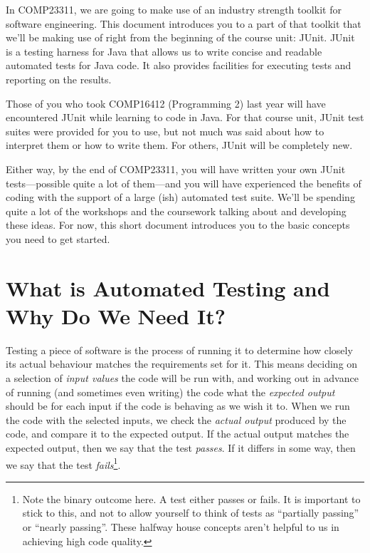 \documentclass[
]{book}
\begin{document}
In COMP23311, we are going to make use of an industry strength toolkit for software engineering. This document introduces you to a part of that toolkit that we'll be making use of right from the beginning of the course unit: JUnit. JUnit is a testing harness for Java that allows us to write concise and readable automated tests for Java code. It also provides facilities for executing tests and reporting on the results.

Those of you who took COMP16412 (Programming 2) last year will have encountered JUnit while learning to code in Java. For that course unit, JUnit test suites were provided for you to use, but not much was said about how to interpret them or how to write them. For others, JUnit will be completely new.

Either way, by the end of COMP23311, you will have written your own JUnit tests---possible quite a lot of them---and you will have experienced the benefits of coding with the support of a large (ish) automated test suite. We'll be spending quite a lot of the workshops and the coursework talking about and developing these ideas. For now, this short document introduces you to the basic concepts you need to get started.

\hypertarget{automated-test}{%
\section{What is Automated Testing and Why Do We Need It?}\label{automated-test}}

Testing a piece of software is the process of running it to determine how closely its actual behaviour matches the requirements set for it. This means deciding on a selection of \emph{input values} the code will be run with, and working out in advance of running (and sometimes even writing) the code what the \emph{expected output} should be for each input if the code is behaving as we wish it to. When we run the code with the selected inputs, we check the \emph{actual output} produced by the code, and compare it to the expected output. If the actual output matches the expected output, then we say that the test \emph{passes}. If it differs in some way, then we say that the test \emph{fails}\footnote{Note the binary outcome here. A test either passes or fails. It is important to stick to this, and not to allow yourself to think of tests as ``partially passing'' or ``nearly passing''. These halfway house concepts aren't helpful to us in achieving high code quality.}.
\end{document}
